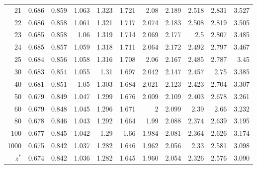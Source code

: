 \begin{center}
\begin{minipage}{5in}
\begin{center}
\begin{tabular}{|r|rrrrrrrrrr|}
21	&	0.686	&	0.859	&	1.063	&	1.323	&	1.721	&	2.08	&	2.189	&	2.518	&	2.831	&	3.527	\\
22	&	0.686	&	0.858	&	1.061	&	1.321	&	1.717	&	2.074	&	2.183	&	2.508	&	2.819	&	3.505	\\
23	&	0.685	&	0.858	&	1.06	&	1.319	&	1.714	&	2.069	&	2.177	&	2.5	&	2.807	&	3.485	\\
24	&	0.685	&	0.857	&	1.059	&	1.318	&	1.711	&	2.064	&	2.172	&	2.492	&	2.797	&	3.467	\\
25	&	0.684	&	0.856	&	1.058	&	1.316	&	1.708	&	2.06	&	2.167	&	2.485	&	2.787	&	3.45	\\
30	&\cellcolor{lightgray}	0.683	&\cellcolor{lightgray}	0.854	&\cellcolor{lightgray}	1.055	&\cellcolor{lightgray}	1.31	&\cellcolor{lightgray}	1.697	&\cellcolor{lightgray}	2.042	&\cellcolor{lightgray}	2.147	&\cellcolor{lightgray}	2.457	&\cellcolor{lightgray}	2.75	&\cellcolor{lightgray}	3.385	\\
40	&\cellcolor{lightgray}	0.681	&\cellcolor{lightgray}	0.851	&\cellcolor{lightgray}	1.05	&\cellcolor{lightgray}	1.303	&\cellcolor{lightgray}	1.684	&\cellcolor{lightgray}	2.021	&\cellcolor{lightgray}	2.123	&\cellcolor{lightgray}	2.423	&\cellcolor{lightgray}	2.704	&\cellcolor{lightgray}	3.307	\\
50	&\cellcolor{lightgray}	0.679	&\cellcolor{lightgray}	0.849	&\cellcolor{lightgray}	1.047	&\cellcolor{lightgray}	1.299	&\cellcolor{lightgray}	1.676	&\cellcolor{lightgray}	2.009	&\cellcolor{lightgray}	2.109	&\cellcolor{lightgray}	2.403	&\cellcolor{lightgray}	2.678	&\cellcolor{lightgray}	3.261	\\
60	&\cellcolor{lightgray}	0.679	&\cellcolor{lightgray}	0.848	&\cellcolor{lightgray}	1.045	&\cellcolor{lightgray}	1.296	&\cellcolor{lightgray}	1.671	&\cellcolor{lightgray}	2	&\cellcolor{lightgray}	2.099	&\cellcolor{lightgray}	2.39	&\cellcolor{lightgray}	2.66	&\cellcolor{lightgray}	3.232	\\
80	&\cellcolor{lightgray}	0.678	&\cellcolor{lightgray}	0.846	&\cellcolor{lightgray}	1.043	&\cellcolor{lightgray}	1.292	&\cellcolor{lightgray}	1.664	&\cellcolor{lightgray}	1.99	&\cellcolor{lightgray}	2.088	&\cellcolor{lightgray}	2.374	&\cellcolor{lightgray}	2.639	&\cellcolor{lightgray}	3.195	\\
100	&	0.677	&	0.845	&	1.042	&	1.29	&	1.66	&	1.984	&	2.081	&	2.364	&	2.626	&	3.174	\\
1000	&	0.675	&	0.842	&	1.037	&	1.282	&	1.646	&	1.962	&	2.056	&	2.33	&	2.581	&	3.098	\\
\hline \cellcolor{lightgray}$z^*$	&\cellcolor{lightgray}	0.674	&\cellcolor{lightgray}	0.842	&\cellcolor{lightgray}	1.036	&\cellcolor{lightgray}	1.282	&\cellcolor{lightgray}	1.645	&\cellcolor{lightgray}	1.960	&\cellcolor{lightgray}	2.054	&\cellcolor{lightgray}	2.326	&\cellcolor{lightgray}	2.576	&\cellcolor{lightgray}	3.090	\\

\end{tabular}
\end{center}
\end{minipage}
\end{center}

